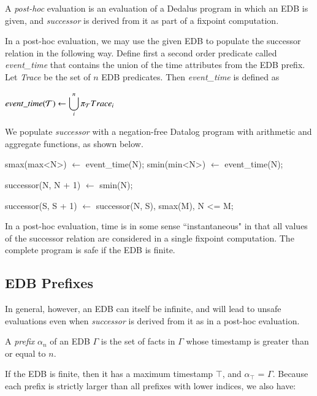 \begin{definition}
A \emph{post-hoc} evaluation is an evaluation of a Dedalus program in which an EDB is given, and \emph{successor} is derived from it
as part of a fixpoint computation.
\end{definition}

In a post-hoc evaluation, we may use the given EDB to populate the successor relation in the following way.
Define first a second order predicate called \emph{event\_time} 
that contains the union of the time attributes from the EDB prefix. Let \emph{Trace} be the set of $n$ EDB predicates.  
Then \emph{event\_time} is defined as

$event\_time(\Tau) \leftarrow \displaystyle\bigcup_{i}^n \pi_{\Tau}Trace_{i}$

We populate \emph{successor} with a negation-free Datalog program with arithmetic and aggregate functions, as shown below.

\begin{Dedalus}
smax(max<N>) \(\leftarrow\) event\_time(N);
smin(min<N>) \(\leftarrow\) event\_time(N);

successor(N, N + 1) \(\leftarrow\) smin(N);

successor(S, S + 1) \(\leftarrow\) 
    successor(N, S),
    smax(M),
    N <= M;
\end{Dedalus}

In a post-hoc evaluation, time is in some sense ``instantaneous" in that all values of the successor relation are considered in a single
fixpoint computation.  The complete program is safe if the EDB is finite.

\subsection{EDB Prefixes}

In general, however, an EDB can itself be infinite, and will lead to unsafe evaluations even when \emph{successor} is derived from it
as in a post-hoc evaluation.

\begin{definition}
A \emph{prefix} $\alpha_{n}$ of an EDB $\Gamma$ is the set of facts in $\Gamma$ whose timestamp is greater than or equal to $n$.
\end{definition}

If the EDB is finite, then it has a maximum timestamp $\top$, and $\alpha_{\top}$ = $\Gamma$.  Because each prefix is strictly larger than
all prefixes with lower indices, we also have:

